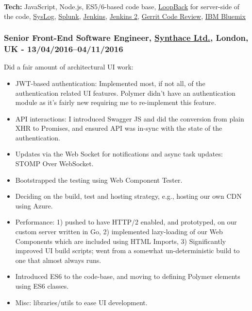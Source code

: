 \documentclass[
  a4paper,
  8pt,
]{article}
\providecommand{\tightlist}{%
  \setlength{\itemsep}{0pt}\setlength{\parskip}{0pt}}
\begin{document}
\begin{multicols}{2}
\textbf{Tech:} JavaScript, Node.js, ES5/6-based code base,
\href{https://loopback.io}{LoopBack} for server-side of the code,
\href{https://en.wikipedia.org/wiki/Syslog}{SysLog},
\href{http://www.splunk.com}{Splunk},
\href{https://www.jenkins.io}{Jenkins},
\href{https://www.jenkins.io/2.0}{Jenkins 2},
\href{https://www.gerritcodereview.com/}{Gerrit Code Review},
\href{https://en.wikipedia.org/wiki/Bluemix}{IBM Bluemix}

\hypertarget{senior-front-end-software-engineer-synthace-ltd.-london-uk---1304201604112016}{%
\subsubsection{\texorpdfstring{Senior Front-End Software Engineer,
\href{https://synthace.com}{Synthace Ltd.}, London, UK -
13/04/2016--04/11/2016}{Senior Front-End Software Engineer, Synthace Ltd., London, UK - 13/04/2016--04/11/2016}}\label{senior-front-end-software-engineer-synthace-ltd.-london-uk---1304201604112016}}

Did a fair amount of architectural UI work:

\begin{itemize}
\tightlist
\item
  JWT-based authentication: Implemented most, if not all, of the
  authentication related UI features. Polymer didn't have an
  authentication module as it's fairly new requiring me to re-implement
  this feature.
\item
  API interactions: I introduced Swagger JS and did the conversion from
  plain XHR to Promises, and ensured API was in-sync with the state of
  the authentication.
\item
  Updates via the Web Socket for notifications and async task updates:
  STOMP Over WebSocket.
\item
  Bootstrapped the testing using Web Component Tester.
\item
  Deciding on the build, test and hosting strategy, e.g., hosting our
  own CDN using Azure.
\item
  Performance: 1) pushed to have HTTP/2 enabled, and prototyped, on our
  custom server written in Go, 2) implemented lazy-loading of our Web
  Components which are included using HTML Imports, 3) Significantly
  improved UI build scripts; went from a somewhat un-deterministic build
  to one that almost always runs.
\item
  Introduced ES6 to the code-base, and moving to defining Polymer
  elements using ES6 classes.
\item
  Misc: libraries/utils to ease UI development.
\end{itemize}


\end{multicols}
\end{document}
